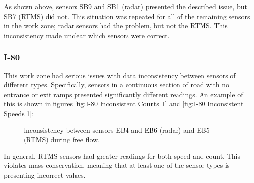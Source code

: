 \documentclass[11pt]{article}
\begin{document}
\noindent
As shown above, sensors SB9 and SB1 (radar) presented the described issue, but SB7 (RTMS) did not. This situation was repeated for all of the remaining sensors in the work zone; radar sensors had the problem, but not the RTMS. This inconsistency made unclear which sensors were correct.



\subsubsection{I-80}
This work zone had serious issues with data inconsistency between sensors of different types. Specifically, sensors in a continuous section of road with no entrance or exit ramps presented significantly different readings. An example of this is shown in figures \ref{fig:I-80 Inconsistent Counts 1} and \ref{fig:I-80 Inconsistent Speeds 1}:

\begin{figure}[H]
  \centering
  \hfill
  \caption{Inconsistency between sensors EB4 and EB6 (radar) and EB5 (RTMS) during free flow.}
\end{figure}
\noindent
In general, RTMS sensors had greater readings for both speed and count. This violates mass conservation, meaning that at least one of the sensor types is presenting incorrect values.
 
\end{document}
